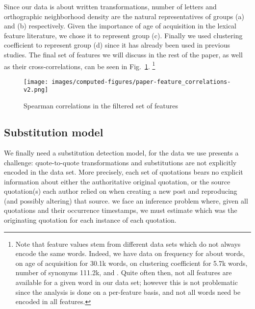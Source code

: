 \begin{new}
Since our data is about written transformations, number of letters and orthographic neighborhood density are the natural representatives of groups (a) and (b) respectively.
Given the importance of age of acquisition in the lexical feature literature, we chose it to represent group (c).
Finally we used clustering coefficient to represent group (d) since it has already been used in previous studies.
The final set of features we will discuss in the rest of the paper, as well as their cross-correlations, can be seen in Fig.~\ref{fig:feature-corrs-filtered}.
\footnote{
Note that feature values stem from different data sets which do not always encode the same words.
Indeed, we have data on frequency for about  words, on age of acquisition for 30.1k words, on clustering coefficient for 5.7k words, number of synonyms 111.2k, and .
Quite often then, not all features are available for a given word in our data set;
however this is not problematic since the analysis is done on a per-feature basis, and not all words need be encoded in all features.}
\end{new}

\begin{figure}[!th]
    \centering
    \texttt{[image: images/computed-figures/paper-feature\_correlations-v2.png]}
    \caption{Spearman correlations in the filtered set of features}
    \label{fig:feature-corrs-filtered}
\end{figure}


\subsection{Substitution model}
\label{sec:temporal-binning}\label{sec:model}

We finally need a substitution detection model, for the  data we use presents a challenge:
quote-to-quote transformations and substitutions are not explicitly encoded in the data set.
More precisely, each set of quotations bears no explicit information about either the authoritative original quotation, or the source quotation(s) each author relied on when creating a new post and reproducing (and possibly altering) that source.
 we face an inference problem where, given all quotations and their occurrence timestamps, we must estimate which was the originating quotation for each instance of each quotation.

